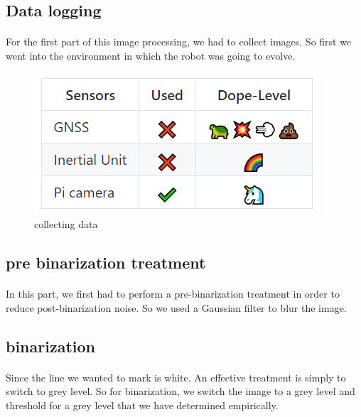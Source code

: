 
\subsection{Data logging}
\paragraph{}
For the first part of this image processing, we had to collect images.
So first we went into the environment in which the robot was going to evolve.

\begin{figure}[h!]
    \begin{center}
        \includegraphics[scale=0.3]{Images/Sensors.png}
    \end{center}
    \caption{collecting data}
    \label{fig:capture}
\end{figure}

\subsection{pre binarization treatment}
\paragraph{}
In this part, we first had to perform a pre-binarization treatment in order to reduce post-binarization noise.
So we used a Gaussian filter to blur the image.

\subsection{binarization}
\paragraph{}
Since the line we wanted to mark is white. An effective treatment is simply to switch to grey level. 
So for binarization, we switch the image to a grey level and threshold for a grey level that we have determined empirically.

